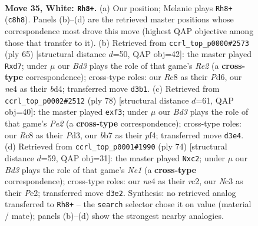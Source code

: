 \documentclass[11pt]{article}
\begin{document}
\clearpage

\begin{figure}[p]\centering
\begin{subfigure}{0.46\textwidth}\centering
\resizebox{\linewidth}{!}{%
\newchessgame
\chessboard[
  setfen={2R5/1b3pp1/4p2k/1p5p/1r1PnP1P/2NBP1P1/8/6K1 w - - 8 35},
  showmover=false,
  pgfstyle=straightmove, color=movearrow, markmove={c8-h8}
]}
\caption{}
\end{subfigure}\hfill
\begin{subfigure}{0.46\textwidth}\centering
\resizebox{\linewidth}{!}{%
\newchessgame
\chessboard[
  setfen={7k/1p1Nr1p1/p2p3p/P3n3/3B4/3P2R1/1P4PP/5K2 b - - 0 33},
  showmover=false,
  pgfstyle=straightmove, color=movearrow, markmove={e7-d7}
]}
\caption{}
\end{subfigure}
\\[4pt]
\begin{subfigure}{0.46\textwidth}\centering
\resizebox{\linewidth}{!}{%
\newchessgame
\chessboard[
  setfen={7k/1p5p/p1b5/P2pr3/1P1N1pR1/3P1n2/4P3/7K w - - 0 40},
  showmover=false,
  pgfstyle=straightmove, color=movearrow, markmove={e2-f3}
]}
\caption{}
\end{subfigure}\hfill
\begin{subfigure}{0.46\textwidth}\centering
\resizebox{\linewidth}{!}{%
\newchessgame
\chessboard[
  setfen={1r3k2/5pp1/5n1p/5b2/p2p3P/3B1PP1/1Pr1P3/R3N1K1 w - - 0 38},
  showmover=false,
  pgfstyle=straightmove, color=movearrow, markmove={e1-c2}
]}
\caption{}
\end{subfigure}
\caption{\textbf{Move 35, White: \texttt{Rh8+}.} (a) Our position; Melanie plays \texttt{Rh8+} (\texttt{c8h8}). Panels (b)--(d) are the retrieved master positions whose correspondence most drove this move (highest QAP objective among those that transfer to it). (b) Retrieved from \texttt{ccrl\_top\_p0000\#2573} (ply 65) [structural distance $d$=50, QAP obj=42]: the master played \texttt{Rxd7}; under $\mu$ our \emph{Bd3} plays the role of that game's \emph{Re2} (a \textbf{cross-type} correspondence); cross-type roles: our \emph{R}c8 as their \emph{P}d6, our \emph{n}e4 as their \emph{b}d4; transferred move \texttt{d3b1}. (c) Retrieved from \texttt{ccrl\_top\_p0002\#2512} (ply 78) [structural distance $d$=61, QAP obj=40]: the master played \texttt{exf3}; under $\mu$ our \emph{Bd3} plays the role of that game's \emph{Pe2} (a \textbf{cross-type} correspondence); cross-type roles: our \emph{R}c8 as their \emph{P}d3, our \emph{b}b7 as their \emph{p}f4; transferred move \texttt{d3e4}. (d) Retrieved from \texttt{ccrl\_top\_p0001\#1990} (ply 74) [structural distance $d$=59, QAP obj=31]: the master played \texttt{Nxc2}; under $\mu$ our \emph{Bd3} plays the role of that game's \emph{Ne1} (a \textbf{cross-type} correspondence); cross-type roles: our \emph{n}e4 as their \emph{r}c2, our \emph{N}c3 as their \emph{P}e2; transferred move \texttt{d3e2}. Synthesis: no retrieved analog transferred to \texttt{Rh8+} -- the \texttt{search} selector chose it on value (material / mate); panels (b)--(d) show the strongest nearby analogies.}
\label{fig:thought-m68}
\end{figure}
\end{document}
